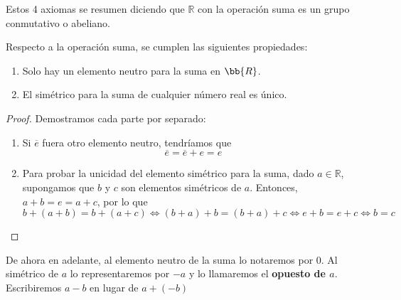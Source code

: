 Estos 4 axiomas se resumen diciendo que $\mathbb{R}$ con la operación suma es un grupo conmutativo o abeliano.\\

\begin{prop} Respecto a la operación suma, se cumplen las siguientes propiedades:
    \begin{enumerate}
        \item Solo hay un elemento neutro para la suma en $\bb{R}$.
        \item El simétrico para la suma de cualquier número real es único.
    \end{enumerate}
\end{prop}
\begin{proof} Demostramos cada parte por separado:
\begin{enumerate}
    \item Si $\overline{e}$ fuera otro elemento neutro, tendríamos que
    \begin{equation*}
        \overline{e} = \overline{e} + e = e
    \end{equation*}

    \item Para probar la unicidad del elemento simétrico para la suma, dado $a \in \mathbb{R}$, supongamos que $b$ y $c$ son elementos simétricos de $a$.
    Entonces, $a+b=e=a+c$, por lo que
    \begin{equation*}
        b+(a+b)=b+(a+c) \Longleftrightarrow (b+a)+b=(b+a)+c \Longleftrightarrow e+b=e+c \Longleftrightarrow b=c
    \end{equation*}
\end{enumerate}
\end{proof}

De ahora en adelante, al elemento neutro de la suma lo notaremos por $0$. Al simétrico de $a$ lo representaremos por $-a$ y lo llamaremos el \textbf{opuesto de $a$}. Escribiremos $a-b$ en lugar de $a+(-b)$


